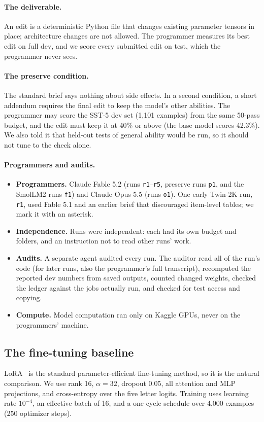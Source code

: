 \paragraph{The deliverable.} An edit is a deterministic Python file that changes existing parameter tensors in place; architecture changes are not allowed. The programmer measures its best edit on full dev, and we score every submitted edit on test, which the programmer never sees.

\paragraph{The preserve condition.} The standard brief says nothing about side effects. In a second condition, a short addendum requires the final edit to keep the model's other abilities. The programmer may score the SST-5 dev set (1,101 examples) from the same 50-pass budget, and the edit must keep it at 40\% or above (the base model scores 42.3\%). We also told it that held-out tests of general ability would be run, so it should not tune to the check alone.

\paragraph{Programmers and audits.}
\begin{itemize}
  \item \textbf{Programmers.} Claude Fable 5.2 (runs \texttt{r1}--\texttt{r5}, preserve runs \texttt{p1}, and the SmolLM2 runs \texttt{f1}) and Claude Opus 5.5 (runs \texttt{o1}). One early Twin-2K run, \texttt{r1}, used Fable 5.1 and an earlier brief that discouraged item-level tables; we mark it with an asterisk.
  \item \textbf{Independence.} Runs were independent: each had its own budget and folders, and an instruction not to read other runs' work.
  \item \textbf{Audits.} A separate agent audited every run. The auditor read all of the run's code (for later runs, also the programmer's full transcript), recomputed the reported dev numbers from saved outputs, counted changed weights, checked the ledger against the jobs actually run, and checked for test access and copying.
  \item \textbf{Compute.} Model computation ran only on Kaggle GPUs, never on the programmers' machine.
\end{itemize}

\subsection{The fine-tuning baseline}
LoRA~\citep{hu2022lora} is the standard parameter-efficient fine-tuning method, so it is the natural comparison. We use rank 16, $\alpha=32$, dropout 0.05, all attention and MLP projections, and cross-entropy over the five letter logits. Training uses learning rate $10^{-4}$, an effective batch of 16, and a one-cycle schedule over 4,000 examples (250 optimizer steps).

